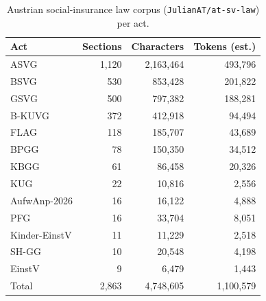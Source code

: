 \begin{table}[t]
\centering
\small
\caption{Austrian social-insurance law corpus (\nolinkurl{JulianAT/at-sv-law}) per act.}
\label{tab:corpus}
\setlength{\tabcolsep}{4pt}
\begin{tabular}{lrrr}
\toprule
Act & Sections & Characters & Tokens (est.) \\
\midrule
ASVG & 1{,}120 & 2{,}163{,}464 & 493{,}796 \\
BSVG & 530 & 853{,}428 & 201{,}822 \\
GSVG & 500 & 797{,}382 & 188{,}281 \\
B-KUVG & 372 & 412{,}918 & 94{,}494 \\
FLAG & 118 & 185{,}707 & 43{,}689 \\
BPGG & 78 & 150{,}350 & 34{,}512 \\
KBGG & 61 & 86{,}458 & 20{,}326 \\
KUG & 22 & 10{,}816 & 2{,}556 \\
AufwAnp-2026 & 16 & 16{,}122 & 4{,}888 \\
PFG & 16 & 33{,}704 & 8{,}051 \\
Kinder-EinstV & 11 & 11{,}229 & 2{,}518 \\
SH-GG & 10 & 20{,}548 & 4{,}198 \\
EinstV & 9 & 6{,}479 & 1{,}443 \\
\midrule
Total & 2{,}863 & 4{,}748{,}605 & 1{,}100{,}579 \\
\bottomrule
\end{tabular}
\par{}
\end{table}
